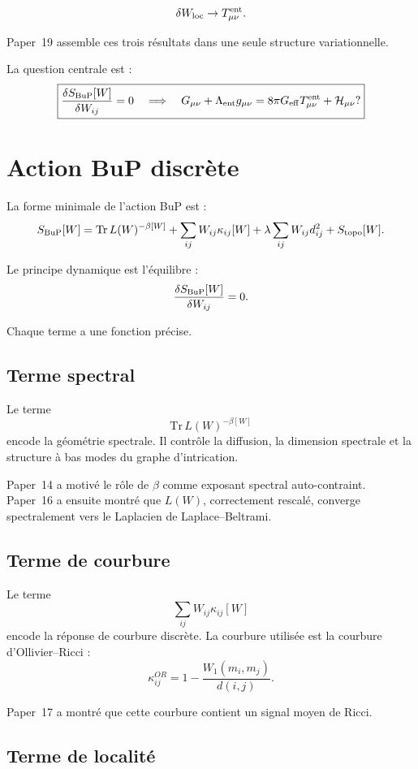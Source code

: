 \documentclass[11pt,a4paper]{article}
\begin{document}
\[
\delta W_{\rm loc}\to T_{\mu\nu}^{\rm ent}.
\]

Paper~19 assemble ces trois résultats dans une seule structure variationnelle.

La question centrale est :
\[
\boxed{
\frac{\delta S_{\rm BuP}[W]}{\delta W_{ij}}=0
\quad
\Longrightarrow
\quad
G_{\mu\nu}
+
\Lambda_{\rm ent}g_{\mu\nu}
=
8\pi G_{\rm eff}T_{\mu\nu}^{\rm ent}
+
\mathcal{H}_{\mu\nu}
?
}
\]

\section{Action BuP discrète}

La forme minimale de l'action BuP est :
\[
S_{\rm BuP}[W]
=
\mathrm{Tr}\,L(W)^{-\beta[W]}
+
\sum_{ij}W_{ij}\kappa_{ij}[W]
+
\lambda\sum_{ij}W_{ij}d_{ij}^{2}
+
S_{\rm topo}[W].
\]

Le principe dynamique est l'équilibre :
\[
\frac{\delta S_{\rm BuP}[W]}{\delta W_{ij}}=0.
\]

Chaque terme a une fonction précise.

\subsection{Terme spectral}

Le terme
\[
\mathrm{Tr}\,L(W)^{-\beta[W]}
\]
encode la géométrie spectrale. Il contrôle la diffusion, la dimension
spectrale et la structure à bas modes du graphe d'intrication.

Paper~14 a motivé le rôle de \(\beta\) comme exposant spectral auto-contraint.
Paper~16 a ensuite montré que \(L(W)\), correctement rescalé, converge
spectralement vers le Laplacien de Laplace--Beltrami.

\subsection{Terme de courbure}

Le terme
\[
\sum_{ij}W_{ij}\kappa_{ij}[W]
\]
encode la réponse de courbure discrète. La courbure utilisée est la courbure
d'Ollivier--Ricci :
\[
\kappa_{ij}^{OR}
=
1-
\frac{W_1(m_i,m_j)}{d(i,j)}.
\]

Paper~17 a montré que cette courbure contient un signal moyen de Ricci.

\subsection{Terme de localité}
\end{document}
